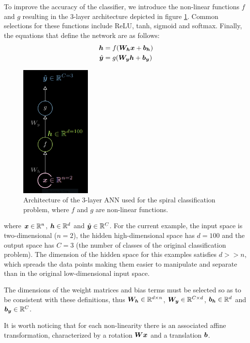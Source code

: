 To improve the accuracy of the classifier, we introduce the non-linear functions $f$ and $g$ resulting in the 3-layer architecture depicted in figure \ref{fig:3-layer_arch}. Common selections for these functions include ReLU, tanh, sigmoid and softmax. Finally, the equations that define the network are as follows:
\begin{align*}
    \bm{h} &= f(\bm{W}_{\bm{h}}\bm{x} + \bm{b}_{\bm{h}}) \\
    \hat{\bm{y}} &= g(\bm{W}_{\bm{y}}\bm{h} + \bm{b}_{\bm{y}})
\end{align*}

\begin{figure}[ht]
    \centering
    \includegraphics[width=100pt]{labs/02/images/architecture.png}
    \caption{Architecture of the 3-layer ANN used for the spiral classification problem, where $f$ and $g$ are non-linear functions.}
    \label{fig:3-layer_arch}
\end{figure}

where $\bm{x} \in \mathbb{R}^n$, $\bm{h} \in \mathbb{R}^d$ and $\hat{\bm{y}} \in \mathbb{R}^C$. For the current example, the input space is two-dimensional ($n=2$), the hidden high-dimensional space has $d=100$ and the output space has $C=3$ (the number of classes of the original classification problem). The dimension of the hidden space for this examples satisfies $d >> n$, which spreads the data points making them easier to manipulate and separate than in the original low-dimensional input space.

The dimensions of the weight matrices and bias terms must be selected so as to be consistent with these definitions, thus $\bm{W}_{\bm{h}} \in \mathbb{R}^{d \times n}$, $\bm{W}_{\bm{y}} \in \mathbb{R}^{C \times d}$, $\bm{b}_{\bm{h}} \in \mathbb{R}^d$ and $\bm{b}_{\bm{y}} \in \mathbb{R}^C$.

It is worth noticing that for each non-linearity there is an associated affine transformation, characterized by a rotation $\bm{W}\bm{x}$ and a translation $\bm{b}$.


